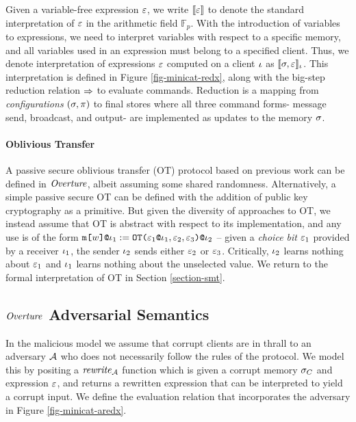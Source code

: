 Given a variable-free expression $\varepsilon$, we write $\llbracket \varepsilon \rrbracket$ to denote
the standard interpretation of $\varepsilon$ in the arithmetic field
$\mathbb{F}_{p}$. With the introduction of variables to expressions,
we need to interpret variables with respect to a specific memory, and
all variables used in an expression must belong to a specified client.
Thus, we denote interpretation of expressions $\varepsilon$ computed on a
client $\iota$ as $\llbracket \sigma,\varepsilon \rrbracket_{\iota}$. This interpretation is
defined in Figure \ref{fig-minicat-redx}, along with the big-step
reduction relation $\Rightarrow$ to evaluate commands. Reduction is a mapping
from \emph{configurations} $(\sigma,\pi)$ to final stores
where all three command forms- message send, broadcast, and
output- are implemented as updates to the memory $\sigma$. 


\paragraph{Oblivious Transfer} A passive secure oblivious transfer (OT) protocol
based on previous work \cite{barthe2019probabilistic} can be defined
in $\mathit{Overture}$, albeit assuming some shared randomness. Alternatively,
a simple passive secure OT can be defined with the addition of public
key cryptography as a primitive. But given the diversity of approaches
to OT, we instead assume that OT is abstract with respect to its
implementation, and any use is of the form
$\texttt{m[}w\texttt{]}\texttt{@}\iota_1 := \texttt{OT(}\varepsilon_1\texttt{@}\iota_1,\varepsilon_2,\varepsilon_3 \texttt{)}\texttt{@}\iota_2$ --
given a \emph{choice bit} $\varepsilon_1$ provided by a receiver $\iota_1$, the
sender $\iota_2$ sends either $\varepsilon_2$
or $\varepsilon_3$.  Critically, $\iota_2$ learns nothing about $\varepsilon_1$ and
$\iota_1$ learns nothing about the unselected value. We return to
the formal interpretation of OT in Section \ref{section-smt}.

\subsection{$\mathit{Overture}$ Adversarial Semantics}
  
\minicataredxfig

In the malicious model we assume that corrupt clients are in
thrall to an adversary $\mathcal{A}$ who does not necessarily follow
the rules of the protocol.  We model this by positing a $\mathit{rewrite}_{\mathcal{A}}$
function which is given a corrupt memory $\sigma_C$ and expression
$\varepsilon$, and returns a rewritten expression that can be interpreted to
yield a corrupt input. We define the evaluation relation that
incorporates the adversary in Figure \ref{fig-minicat-aredx}.

